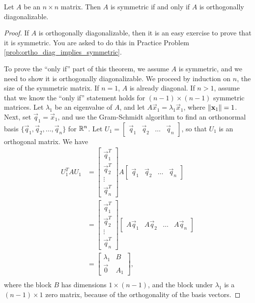\documentclass{ximera}
\begin{document}
\begin{theorem}\label{th:PrinAxes}
Let  $A$ be an $n \times n$ matrix.  Then $A$ is symmetric if and only if $A$ is orthogonally diagonalizable.
\end{theorem}
\begin{proof}
If $A$ is orthogonally diagonalizable, then it is an easy exercise to prove that it is symmetric.  You are asked to do this in Practice Problem \ref{prob:ortho_diag_implies_symmetric}.

To prove the ``only if'' part of this theorem, we assume $A$ is symmetric, and we need to show it is orthogonally diagonalizable.  We proceed by induction on $n$, the size of the symmetric matrix. If $n = 1$, $A$ is already diagonal. If $n > 1$, assume that we know the ``only if'' statement holds for $(n - 1) \times (n - 1)$ symmetric matrices. Let $\lambda_{1}$ be an eigenvalue of $A$, and let $A\vec{x}_{1} = \lambda_{1}\vec{x}_{1}$, where $\left\lVert\mathbf{x}_{1}\right\rVert = 1$. Next, set $\vec{q}_{1}=\vec{x}_{1}$, and use the Gram-Schmidt algorithm to find an orthonormal basis $\{\vec{q}_{1}, \vec{q}_{2}, \dots, \vec{q}_{n}\}$ for $\mathbb{R}^n$. Let $U_{1} = \begin{bmatrix}
\vec{q}_{1} & \vec{q}_{2} & \dots & \vec{q}_{n}
\end{bmatrix}$, so that $U_{1}$ is an orthogonal matrix.  We have
\begin{align*}
U_{1}^TAU_{1} &= \begin{bmatrix}
\vec{q}_{1}^T \\ \vec{q}_{2}^T \\ \vdots \\ \vec{q}_{n}^T
\end{bmatrix} A \begin{bmatrix}
\vec{q}_{1} & \vec{q}_{2} & \dots & \vec{q}_{n}
\end{bmatrix} \\
&= \begin{bmatrix}
\vec{q}_{1}^T \\ \vec{q}_{2}^T \\ \vdots \\ \vec{q}_{n}^T
\end{bmatrix} \begin{bmatrix}
A \vec{q}_{1} & A \vec{q}_{2} & \dots & A \vec{q}_{n}
\end{bmatrix} \\
&=
\begin{bmatrix}
\lambda_{1} & B \\
\vec{0} & A_{1}
\end{bmatrix},\\
\end{align*} 
where the block $B$ has dimensions $1 \times (n-1)$, and the block under $\lambda_1$ is a $(n-1) \times 1$ zero matrix, because of the orthogonality of the basis vectors.


\end{proof}
\end{document}
